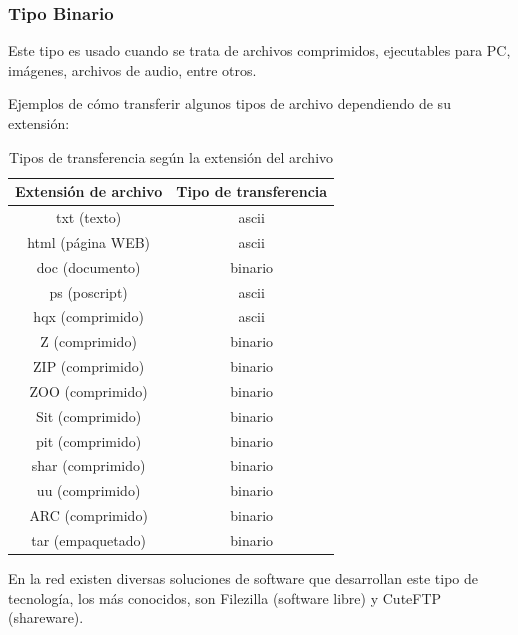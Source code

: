 \documentclass[a4paper, 12pt]{article}
\begin{document}
\subsubsection{Tipo Binario}
Este tipo es usado cuando se trata de archivos comprimidos, ejecutables para PC, imágenes, archivos de audio, entre otros.

Ejemplos de cómo transferir algunos tipos de archivo dependiendo de su extensión:

\begin{table}[ht]
\centering
\begin{tabular}{|c|c|}
\hline
\textbf{Extensión de archivo} & \textbf{Tipo de transferencia} \\ \hline
txt (texto) & ascii \\ \hline
html (página WEB) & ascii \\ \hline
doc (documento) & binario \\ \hline
ps (poscript) & ascii \\ \hline
hqx (comprimido) & ascii \\ \hline
Z (comprimido) & binario \\ \hline
ZIP (comprimido) & binario \\ \hline
ZOO (comprimido) & binario \\ \hline
Sit (comprimido) & binario \\ \hline
pit (comprimido) & binario \\ \hline
shar (comprimido) & binario \\ \hline
uu (comprimido) & binario \\ \hline
ARC (comprimido) & binario \\ \hline
tar (empaquetado) & binario \\ \hline
\end{tabular}
\caption{Tipos de transferencia según la extensión del archivo}
\label{tab:tipos_transferencia}
\end{table}

En la red existen diversas soluciones de software que desarrollan este tipo de tecnología, los más conocidos, son Filezilla (software libre) y CuteFTP (shareware).
\end{document}
